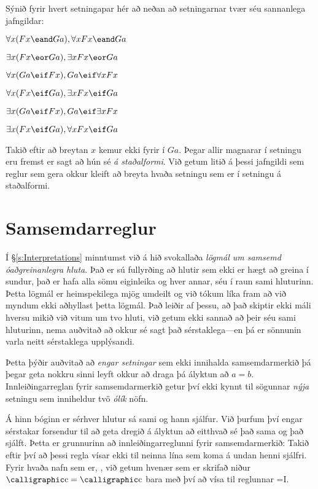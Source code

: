 \problempart
Sýnið fyrir hvert setningapar hér að neðan að setningarnar tvær séu sannanlega jafngildar:
\begin{earg}
\item $\forall x (Fx \eand Ga), \forall x Fx \eand Ga$
\item $\exists x (Fx \eor Ga), \exists x Fx \eor Ga$
\item $\forall x(Ga \eif Fx), Ga \eif \forall x Fx$
\item $\forall x(Fx \eif Ga), \exists x Fx \eif Ga$
\item $\exists x(Ga \eif Fx), Ga \eif \exists x Fx$
\item $\exists x(Fx \eif Ga), \forall x Fx \eif Ga$
\end{earg}
Takið eftir að breytan $x$ kemur ekki fyrir í $Ga$. Þegar allir magnarar í setningu eru fremst er sagt að hún sé \emph{á staðalformi}. Við getum litið á þessi jafngildi sem reglur sem gera okkur kleift að breyta hvaða setningu sem er í setningu á staðalformi.


\chapter{Samsemdarreglur}

Í \S\ref{s:Interpretations} minntumst við á hið svokallaða \emph{lögmál um samsemd óaðgreinanlegra hluta}. Það er sú fullyrðing að hlutir sem ekki er hægt að greina í sundur, það er hafa alla sömu eiginleika og hver annar, séu í raun sami hluturinn. Þetta lögmál er heimspekilega mjög umdeilt og við tókum líka fram að við myndum ekki aðhyllast þetta lögmál. Það leiðir af þessu, að það skiptir ekki máli hversu mikið við vitum um tvo hluti, við getum ekki sannað að þeir séu sami hluturinn, nema auðvitað að okkur sé sagt það sérstaklega---en þá er sönnunin varla neitt sérstaklega upplýsandi.

Þetta þýðir auðvitað að \emph{engar setningar} sem ekki innihalda samsemdarmerkið þá þegar geta nokkru sinni leyft okkur að draga þá ályktun að $a = b$. Innleiðingarreglan fyrir samsemdarmerkið getur því ekki kynnt til sögunnar \emph{nýja} setningu sem inniheldur tvö \emph{ólík} nöfn. 

Á hinn bóginn er sérhver hlutur sá sami og hann sjálfur. Við þurfum því engar sérstakar forsendur til að geta dregið á ályktun að eitthvað sé það sama og það sjálft. Þetta er grunnurinn að innleiðingarreglunni fyrir samsemdarmerkið: 
Takið eftir því að þessi regla vísar ekki til neinna lína sem koma á undan henni sjálfri. Fyrir hvaða nafn sem er, , við getum hvenær sem er skrifað niður $\meta{c}=\meta{c}$ bara með því að vísa til reglunnar {=}I.

